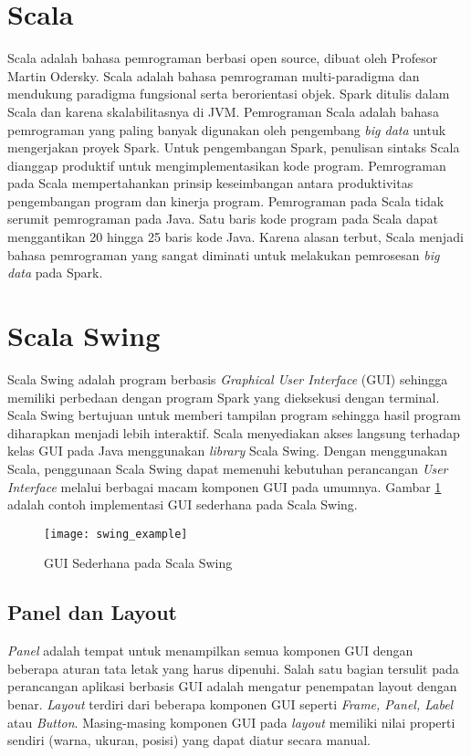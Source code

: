 \section{Scala}
\label{sec:scala}
Scala adalah bahasa pemrograman berbasi open source, dibuat oleh Profesor Martin Odersky. Scala adalah bahasa pemrograman multi-paradigma dan mendukung paradigma fungsional serta berorientasi objek. Spark ditulis dalam Scala dan karena skalabilitasnya di JVM. Pemrograman Scala adalah bahasa pemrograman yang paling banyak digunakan oleh pengembang \textit{big data} untuk mengerjakan proyek Spark. Untuk pengembangan Spark, penulisan sintaks Scala dianggap produktif untuk mengimplementasikan kode program. Pemrograman pada Scala mempertahankan prinsip keseimbangan antara produktivitas pengembangan program dan kinerja program. Pemrograman pada Scala tidak serumit pemrograman pada Java. Satu baris kode program pada Scala dapat menggantikan 20 hingga 25 baris kode Java. Karena alasan terbut, Scala menjadi bahasa pemrograman yang sangat diminati untuk melakukan pemrosesan \textit{big data} pada Spark.

\section{Scala Swing} 
Scala Swing adalah program berbasis \textit{Graphical User Interface} (GUI) sehingga memiliki perbedaan dengan program Spark yang dieksekusi dengan terminal. Scala Swing bertujuan untuk memberi tampilan program sehingga hasil program diharapkan menjadi lebih interaktif. Scala menyediakan akses langsung terhadap kelas GUI pada Java menggunakan \textit{library} Scala Swing.  Dengan menggunakan Scala, penggunaan Scala Swing dapat memenuhi kebutuhan perancangan \textit{User Interface} melalui berbagai macam komponen GUI pada umumnya. Gambar \ref{fig:swing_example} adalah contoh implementasi GUI sederhana pada Scala Swing.

\begin{figure}[H]
	\centering
	\texttt{[image: swing\_example]}
	\caption{GUI Sederhana pada Scala Swing}
	\label{fig:swing_example}
\end{figure}


\subsection{Panel dan Layout}
\textit{Panel} adalah tempat untuk menampilkan semua komponen GUI dengan beberapa aturan tata letak yang harus dipenuhi. Salah satu bagian tersulit pada perancangan aplikasi berbasis GUI adalah mengatur penempatan layout dengan benar. \textit{Layout} terdiri dari beberapa komponen GUI seperti \textit{Frame, Panel, Label} atau \textit{Button}. Masing-masing komponen GUI pada \textit{layout} memiliki nilai properti sendiri (warna, ukuran, posisi) yang dapat diatur secara manual.

